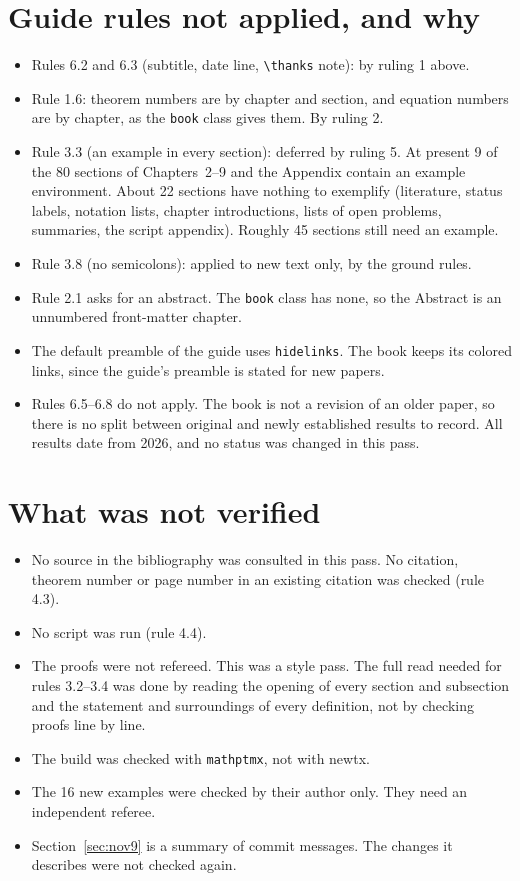 \documentclass[12pt,letterpaper]{article}
\begin{document}
\section{Guide rules not applied, and why}
\begin{itemize}[leftmargin=*]
\item Rules 6.2 and 6.3 (subtitle, date line, \verb|\thanks| note): by ruling 1 above.
\item Rule 1.6: theorem numbers are by chapter and section, and equation numbers are by chapter, as the \texttt{book} class gives them. By ruling 2.
\item Rule 3.3 (an example in every section): deferred by ruling 5. At present 9 of the 80 sections of Chapters~2--9 and the Appendix contain an example environment. About 22 sections have nothing to exemplify (literature, status labels, notation lists, chapter introductions, lists of open problems, summaries, the script appendix). Roughly 45 sections still need an example.
\item Rule 3.8 (no semicolons): applied to new text only, by the ground rules.
\item Rule 2.1 asks for an abstract. The \texttt{book} class has none, so the Abstract is an unnumbered front-matter chapter.
\item The default preamble of the guide uses \texttt{hidelinks}. The book keeps its colored links, since the guide's preamble is stated for new papers.
\item Rules 6.5--6.8 do not apply. The book is not a revision of an older paper, so there is no split between original and newly established results to record. All results date from 2026, and no status was changed in this pass.
\end{itemize}

\section{What was not verified}\label{sec:notverified}
\begin{itemize}[leftmargin=*]
\item No source in the bibliography was consulted in this pass. No citation, theorem number or page number in an existing citation was checked (rule 4.3).
\item No script was run (rule 4.4).
\item The proofs were not refereed. This was a style pass. The full read needed for rules 3.2--3.4 was done by reading the opening of every section and subsection and the statement and surroundings of every definition, not by checking proofs line by line.
\item The build was checked with \texttt{mathptmx}, not with newtx.
\item The 16 new examples were checked by their author only. They need an independent referee.
\item Section~\ref{sec:nov9} is a summary of commit messages. The changes it describes were not checked again.
\end{itemize}
\end{document}

